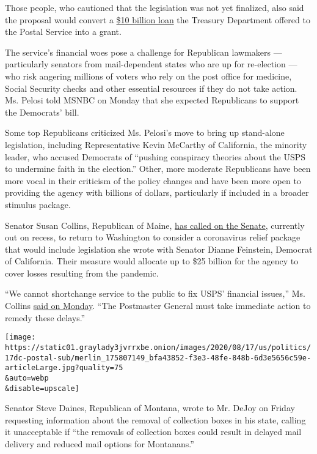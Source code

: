 Those people, who cautioned that the legislation was not yet finalized,
also said the proposal would convert a
\href{https://home.treasury.gov/news/press-releases/sm1071}{\$10 billion
loan} the Treasury Department offered to the Postal Service into a
grant.

The service's financial woes pose a challenge for Republican lawmakers
--- particularly senators from mail-dependent states who are up for
re-election --- who risk angering millions of voters who rely on the
post office for medicine, Social Security checks and other essential
resources if they do not take action. Ms. Pelosi told MSNBC on Monday
that she expected Republicans to support the Democrats' bill.

Some top Republicans criticized Ms. Pelosi's move to bring up
stand-alone legislation, including Representative Kevin McCarthy of
California, the minority leader, who accused Democrats of ``pushing
conspiracy theories about the USPS to undermine faith in the election.''
Other, more moderate Republicans have been more vocal in their criticism
of the policy changes and have been more open to providing the agency
with billions of dollars, particularly if included in a broader stimulus
package.

Senator Susan Collins, Republican of Maine,
\href{https://twitter.com/SenatorCollins/status/1295161050481004544?s=20}{has
called on the Senate}, currently out on recess, to return to Washington
to consider a coronavirus relief package that would include legislation
she wrote with Senator Dianne Feinstein, Democrat of California. Their
measure would allocate up to \$25 billion for the agency to cover losses
resulting from the pandemic.

``We cannot shortchange service to the public to fix USPS' financial
issues,'' Ms. Collins
\href{https://twitter.com/SenatorCollins/status/1295365846211137537?s=20}{said
on Monday}. ``The Postmaster General must take immediate action to
remedy these delays.''

\texttt{[image: https://static01.graylady3jvrrxbe.onion/images/2020/08/17/us/politics/17dc-postal-sub/merlin\_175807149\_bfa43852-f3e3-48fe-848b-6d3e5656c59e-articleLarge.jpg?quality=75\\\&auto=webp\\\&disable=upscale]}

Senator Steve Daines, Republican of Montana, wrote to Mr. DeJoy on
Friday requesting information about the removal of collection boxes in
his state, calling it unacceptable if ``the removals of collection boxes
could result in delayed mail delivery and reduced mail options for
Montanans.''

